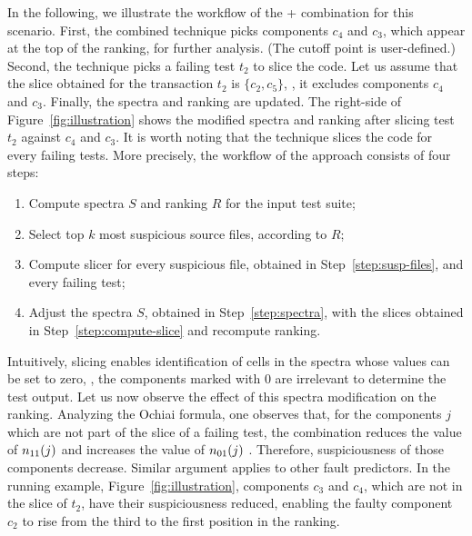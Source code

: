 \documentclass{article}
\begin{document}
In the following, we illustrate the workflow of the \sfl{}+\cs{}
combination for this scenario. First, the combined technique picks
components $c_4$ and $c_3$, which appear at the top of the ranking,
for further analysis. (The cutoff point is user-defined.) Second, the
technique picks a failing test $t_2$ to slice the code.  Let us assume
that the slice obtained for the transaction $t_2$ is $\{c_2, c_5\}$,
\ie, it excludes components $c_4$ and $c_3$. Finally, the spectra and
ranking are updated. The right-side of Figure~\ref{fig:illustration}
shows the modified spectra and ranking after slicing test $t_2$
against $c_4$ and $c_3$. It is worth noting that the technique slices
the code for every failing tests. More precisely, the workflow of the
\comb{} approach consists of four steps: 

\begin{enumerate}
  \itemsep0em
  \item\label{step:spectra} Compute spectra $S$ and ranking $R$ for
  the input test suite;
  \item\label{step:susp-files} Select top $k$ most suspicious source
  files, according to $R$;
  \item\label{step:compute-slice} Compute slicer for every suspicious
    file, obtained in Step~\ref{step:susp-files}, and every failing test;
  \item Adjust the spectra $S$, obtained in Step~\ref{step:spectra}, with
    the slices obtained in Step~\ref{step:compute-slice} and recompute ranking.
\end{enumerate}

Intuitively, slicing enables identification of cells in the spectra
whose values can be set to zero, \ie{}, the components marked with $0$
are irrelevant to determine the test output. Let us now observe the
effect of this spectra modification on the ranking. Analyzing the
Ochiai formula, one observes that, for the components $j$ which are
not part of the slice of a failing test, the combination reduces the
value of $n_{11}(j)$ and increases the value of $n_{01}(j)$ . Therefore,
suspiciousness of those components decrease. Similar argument applies
to other fault predictors. In the running example,
Figure~\ref{fig:illustration}, components $c_3$ and $c_4$, which are
not in the slice of $t_2$, have their suspiciousness reduced, enabling
the faulty component $c_2$ to rise from the third to the first
position in the ranking.
\end{document}
